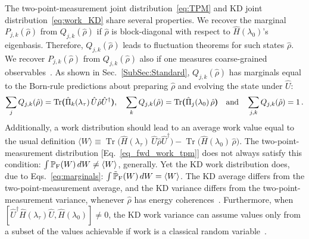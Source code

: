 \documentclass[%
 reprint,
superscriptaddress,
nofootinbib,
bibnotes,
 amsmath,amssymb,
 aps,
]{revtex4-1}
\theoremstyle{plain}
\DeclareMathOperator{\Tr}{Tr}
\begin{document}
The two-point-measurement joint distribution~\eqref{eq:TPM} and KD joint distribution~\eqref{eq:work_KD} share several properties.
We recover the marginal $P_{j,k}(\hat{\rho})$ from $Q_{j,k}(\hat{\rho})$ if $\hat{\rho}$ is block-diagonal with respect to $\hat{H}(\lambda_0)$'s eigenbasis. Therefore, $Q_{j,k}(\hat{\rho})$ leads to fluctuation theorems for such states $\hat{\rho}$. 
We recover $P_{j,k}(\hat{\rho})$ from $Q_{j,k}(\hat{\rho})$ also if one measures coarse-grained observables~\cite{Levy_quasiprobability_2020}. 
As shown in Sec.~\ref{SubSec:Standard}, $Q_{j,k}(\hat{\rho})$ has  marginals equal to the Born-rule predictions about preparing $\hat{\rho}$ and evolving the state under $\hat{U}$:
\begin{equation}
\label{eq:marginals}
    \sum_j Q_{j,k}(\hat{\rho}) 
    = \Tr\bm{(} \hat{\Pi}_k(\lambda_\tau) \, \hat{U} \hat{\rho} \hat{U}^\dagger \bm{)}, \quad  
    \sum_k Q_{j,k}(\hat{\rho}) 
    = \Tr\bm{(}\hat{\Pi}_j(\lambda_0) \, \hat{\rho} \bm{)} 
    \quad {\rm and} \quad 
    \sum_{j,k} Q_{j,k}(\hat{\rho}) =1 \, .
\end{equation}
Additionally, a work distribution should lead to an average work value equal to the usual definition 
$ \langle W \rangle 
\equiv \Tr\bm{(}\hat{H}(\lambda_\tau) \, \hat{U} \hat{\rho} \hat{U}^\dagger \bm{)} - \Tr\bm{(}\hat{H}(\lambda_0) \, \hat{\rho} \bm{)}$.
The two-point-measurement distribution [Eq.~\eqref{eq_fwd_work_tpm}] does not always satisfy this condition: 
$\int  \mathbb{P}_{\rm F}(W) \, dW \neq \langle W \rangle$, generally.
Yet the KD work distribution does, due to Eqs.~\eqref{eq:marginals}: 
$\int  \tilde{\mathbb{P}}_{\rm F}(W) \, dW = \langle W \rangle$. 
The KD average differs from the two-point-measurement average, and the KD variance differs from the two-point-measurement variance, whenever $\hat{\rho}$ has energy coherences~\cite{Diaz_quantum_2022}.
Furthermore, when $[\hat{U}^\dag \hat{H}(\lambda_\tau) \hat{U},  \hat{H}(\lambda_0)]  \neq 0$, the KD work variance can assume values only from a subset of the values achievable if work is a classical random variable~\cite{Lostaglio_kirkwood_2022}.
\end{document}
